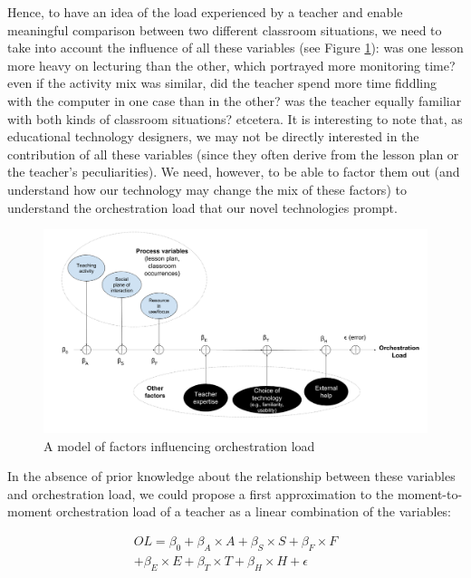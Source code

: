 \documentclass[10pt,journal,compsoc]{IEEEtran}
\begin{document}
Hence, to have an idea of the load experienced by a teacher and enable meaningful comparison between two different classroom situations, we need to take into account the influence of all these variables (see Figure \ref{fig:model}): was one lesson more heavy on lecturing than the other, which portrayed more monitoring time? even if the activity mix was similar, did the teacher spend more time fiddling with the computer in one case than in the other? was the teacher equally familiar with both kinds of classroom situations? etcetera. It is interesting to note that, as educational technology designers, we may not be directly interested in the contribution of all these variables (since they often derive from the lesson plan or the teacher's peculiarities). We need, however, to be able to factor them out (and understand how our technology may change the mix of these factors) to understand the orchestration load that our novel technologies prompt.


\begin{figure}[!t]
\centering
\includegraphics[width=\linewidth]{img/ModelFactorsOL}
\caption{A model of factors influencing orchestration load}
\label{fig:model}
\end{figure}

In the absence of prior knowledge about the relationship between these variables and orchestration load, we could propose a first approximation to the moment-to-moment orchestration load of a teacher as a linear combination of the variables:

\begin{multline}
\label{formOLScat}
OL = \beta_0 + \beta_A\times{}A + \beta_S\times{}S + \beta_F\times{}F \\ + \beta_E\times{}E + \beta_T\times{}T + \beta_H\times{}H + \epsilon
\end{multline}
\end{document}
